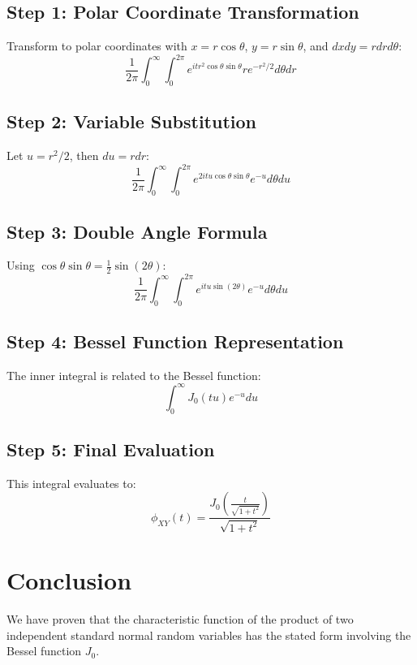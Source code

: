 \documentclass{article}
\begin{document}
\subsection{Step 1: Polar Coordinate Transformation}

Transform to polar coordinates with $x = r \cos \theta$, $y = r \sin \theta$,
and $dxdy = rdrd \theta$:
\begin{equation}
  \frac{1}{2 \pi}  \int_0^{\infty} \int_0^{2 \pi} e^{itr^2 \cos \theta \sin
  \theta} re^{- r^2 / 2} d \theta dr
\end{equation}

\subsection{Step 2: Variable Substitution}

Let $u = r^2 / 2$, then $du = rdr$:
\begin{equation}
  \frac{1}{2 \pi}  \int_0^{\infty} \int_0^{2 \pi} e^{2 itu \cos \theta \sin
  \theta} e^{- u} d \theta du
\end{equation}

\subsection{Step 3: Double Angle Formula}

Using $\cos \theta \sin \theta = \frac{1}{2} \sin (2 \theta)$:
\begin{equation}
  \frac{1}{2 \pi}  \int_0^{\infty} \int_0^{2 \pi} e^{itu \sin (2 \theta)} e^{-
  u} d \theta du
\end{equation}

\subsection{Step 4: Bessel Function Representation}

The inner integral is related to the Bessel function:
\begin{equation}
  \int_0^{\infty} J_0  (tu) e^{- u} du
\end{equation}

\subsection{Step 5: Final Evaluation}

This integral evaluates to:
\begin{equation}
  \phi_{XY} (t) = \frac{J_0 \left( \frac{t}{\sqrt{1 + t^2}} \right)}{\sqrt{1 +
  t^2}} 
\end{equation}

\section{Conclusion}

We have proven that the characteristic function of the product of two
independent standard normal random variables has the stated form involving the
Bessel function $J_0$.

\
\end{document}
